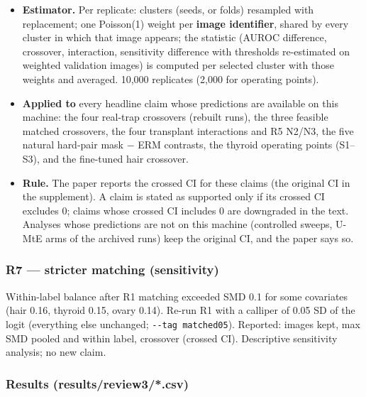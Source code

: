 {\begin{itemize}

\item
  \textbf{Estimator.} Per replicate: clusters (seeds, or folds) resampled with replacement; one Poisson(1) weight per
  \textbf{image identifier}, shared by every cluster in which that image appears; the statistic (AUROC difference,
  crossover, interaction, sensitivity difference with thresholds re-estimated on weighted validation images) is
  computed per selected cluster with those weights and averaged. 10,000 replicates (2,000 for operating points).
\item
  \textbf{Applied to} every headline claim whose predictions are available on this machine: the four real-trap crossovers
  (rebuilt runs), the three feasible matched crossovers, the four transplant interactions and R5 N2/N3, the five
  natural hard-pair mask − ERM contrasts, the thyroid operating points (S1--S3), and the fine-tuned hair crossover.
\item
  \textbf{Rule.} The paper reports the crossed CI for these claims (the original CI in the supplement). A claim is stated
  as supported only if its crossed CI excludes 0; claims whose crossed CI includes 0 are downgraded in the text.
  Analyses whose predictions are not on this machine (controlled sweeps, U-MtE arms of the archived runs) keep the
  original CI, and the paper says so.
\end{itemize}

\subsubsection{R7 --- stricter matching (sensitivity)}\label{r7--stricter-matching-sensitivity}

Within-label balance after R1 matching exceeded \textbar SMD\textbar{} 0.1 for some covariates (hair 0.16, thyroid 0.15, ovary
0.14). Re-run R1 with a calliper of 0.05 SD of the logit (everything else unchanged; \texttt{-\/-tag\ matched05}). Reported:
images kept, max \textbar SMD\textbar{} pooled and within label, crossover (crossed CI). Descriptive sensitivity analysis; no new
claim.

\subsubsection{Results (results/review3/*.csv)}\label{results-resultsreview3csv}

\begin{itemize}


\end{itemize}}
